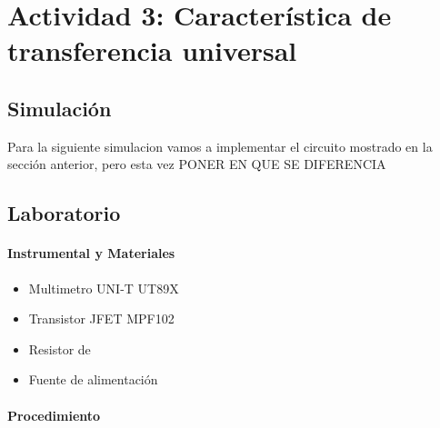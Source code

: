 \newpage

\section{Actividad 3: Característica de transferencia universal}

\subsection{Simulación}

Para la siguiente simulacion vamos a implementar el circuito mostrado en la sección anterior, pero esta vez PONER EN QUE SE DIFERENCIA

\subsection{Laboratorio}

\paragraph{Instrumental y Materiales}
\begin{itemize}
    \item Multimetro UNI-T UT89X
    \item Transistor JFET MPF102
    \item Resistor de
    \item Fuente de alimentación
\end{itemize}

\paragraph{Procedimiento}